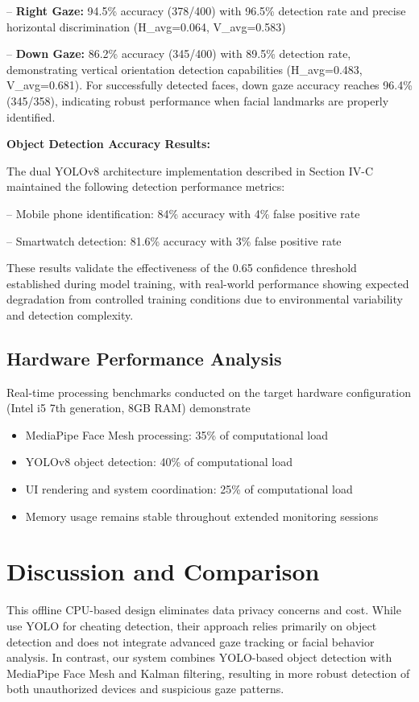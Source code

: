 \documentclass[conference]{IEEEtran}
\begin{document}
-- \textbf{Right Gaze:} 94.5\% accuracy (378/400) with 96.5\% detection rate and precise horizontal discrimination (H\_avg=0.064, V\_avg=0.583)

-- \textbf{Down Gaze:} 86.2\% accuracy (345/400) with 89.5\% detection rate, demonstrating vertical orientation detection capabilities (H\_avg=0.483, V\_avg=0.681). For successfully detected faces, down gaze accuracy reaches 96.4\% (345/358), indicating robust performance when facial landmarks are properly identified.

\textbf{Object Detection Accuracy Results:}

The dual YOLOv8 architecture implementation described in Section IV-C maintained 
the following detection performance metrics:

-- Mobile phone identification: 84\% accuracy with 4\% false positive rate

-- Smartwatch detection: 81.6\% accuracy with 3\% false positive rate

These results validate the effectiveness of the 0.65 confidence threshold established 
during model training, with real-world performance showing expected degradation from 
controlled training conditions due to environmental variability and detection complexity.

\subsection{Hardware Performance Analysis}

Real-time processing benchmarks conducted on the target hardware configuration 
(Intel i5 7th generation, 8GB RAM) demonstrate

\begin{itemize}
    \item MediaPipe Face Mesh processing: 35\% of computational load
    \item YOLOv8 object detection: 40\% of computational load
    \item UI rendering and system coordination: 25\% of computational load
    \item Memory usage remains stable throughout extended monitoring sessions
\end{itemize}

\section{Discussion and Comparison}
This offline CPU-based design eliminates data privacy concerns and cost. While \cite{kaddoura2022} use YOLO for cheating detection, their approach relies primarily on object detection and does not integrate advanced gaze tracking or facial behavior analysis. In contrast, our system combines YOLO-based object detection with MediaPipe Face Mesh\cite{jakhete2024comprehensive} and Kalman filtering\cite{jeong2014kalman,li2020hksiamfc}, resulting in more robust detection of both unauthorized devices and suspicious gaze patterns.
\end{document}
